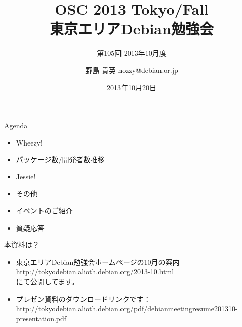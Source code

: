 \title{OSC 2013 Tokyo/Fall \\東京エリアDebian勉強会}
\subtitle{第105回 2013年10月度}
\author{野島 貴英 nozzy@debian.or.jp}
\date{2013年10月20日}



\frame{\titlepage{}}


\begin{frame}{Agenda}
 \begin{itemize}
  \item Wheezy!
　\item パッケージ数/開発者数推移
  \item Jessie! 
  \item その他
  \item イベントのご紹介
  \item 質疑応答
 \end{itemize}
\end{frame}

\begin{frame}{本資料は？}
\begin{itemize}
\item 東京エリアDebian勉強会ホームページの10月の案内\\
  \url{http://tokyodebian.alioth.debian.org/2013-10.html}\\にて公開してます。
\item プレゼン資料のダウンロードリンクです：\\
   \url{http://tokyodebian.alioth.debian.org/pdf/debianmeetingresume201310-presentation.pdf}
\end{itemize}
\end{frame}

